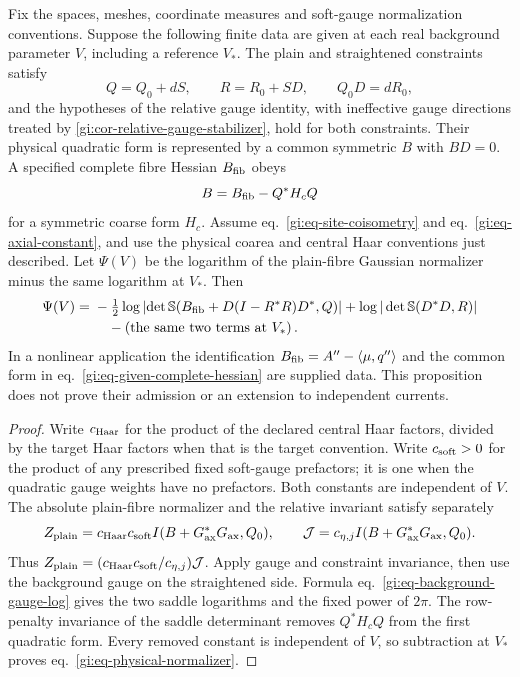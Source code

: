 \documentclass[11pt,letterpaper,reqno]{amsart}
\makeatletter
\numberwithin{equation}{section}
\renewcommand{\eqref}[1]{\textup{eq.~\ref{#1}}}
\theoremstyle{definition}
\newcommand{\ms@minorstart}{%
  \pushQED{\qed}\renewcommand{\qedsymbol}{$\blacksquare$}}
\newenvironment{proposition}[1][]{\ms@minorstart\ms@proposition[#1]}
  {\popQED\endms@proposition}
\theoremstyle{remark}
\makeatother
\begin{document}
\begin{proposition}[Normalized physical Gaussian]
\label{gi:prop-physical-normalizer}
Fix the spaces, meshes, coordinate measures and soft-gauge
normalization conventions. Suppose the following finite data
are given at each real background parameter $V$, including
a reference $V_*$.
The plain and straightened constraints satisfy
\[
 Q=Q_0+dS,\qquad R=R_0+SD,\qquad Q_0D=dR_0,
\]
and the hypotheses of the relative gauge identity,
with ineffective gauge directions treated by \cref{gi:cor-relative-gauge-stabilizer}, hold for both constraints. Their
physical quadratic form is represented by a common
symmetric $B$ with $BD=0$. A specified complete fibre
Hessian $B_{\rm fib}$ obeys
\begin{equation}\label{gi:eq-given-complete-hessian}
                     B=B_{\rm fib}-Q^*H_cQ
\end{equation}
for a symmetric coarse form $H_c$. Assume
\eqref{gi:eq-site-coisometry} and
\eqref{gi:eq-axial-constant}, and use the physical
coarea and central Haar conventions just described.
Let $\Psi(V)$ be the logarithm of the plain-fibre
Gaussian normalizer minus the same logarithm at $V_*$.
Then
\begin{align}
 \Psi(V)={}&
  -\tfrac12\log\left|\det\mathbb S
       (B_{\rm fib}+D(I-R^*R)D^*,Q)\right|
  +\log|\det\mathbb S(D^*D,R)|\nonumber\\
 &\quad-\left(\text{the same two terms at }V_*\right).
 \label{gi:eq-physical-normalizer}
\end{align}
In a nonlinear application the identification
$B_{\rm fib}=A''-\langle\mu,q''\rangle$ and the common
form in \eqref{gi:eq-given-complete-hessian} are supplied
data. This proposition does not prove their admission
or an extension to independent currents.
\end{proposition}

\begin{proof}
Write $c_{\rm Haar}$ for the product of the declared central
Haar factors, divided by the target Haar factors when that
is the target convention. Write $c_{\rm soft}>0$ for the
product of any prescribed fixed soft-gauge prefactors;
it is one when the quadratic gauge weights have no
prefactors. Both constants are independent of $V$.
The absolute plain-fibre normalizer
and the relative invariant satisfy separately
\[
 Z_{\rm plain}=c_{\rm Haar}c_{\rm soft}
                         I(B+G_{\rm ax}^*G_{\rm ax},Q_0),
 \qquad
 \mathcal J=c_{\eta,j}I(B+G_{\rm ax}^*G_{\rm ax},Q_0).
\]
Thus $Z_{\rm plain}=(c_{\rm Haar}c_{\rm soft}/c_{\eta,j})\mathcal J$.
Apply gauge and
constraint invariance, then use the background gauge on
the straightened side. Formula
\eqref{gi:eq-background-gauge-log} gives the two saddle
logarithms and the fixed power of $2\pi$. The row-penalty
invariance of the saddle determinant removes $Q^*H_cQ$
from the first quadratic form. Every removed constant
is independent of $V$, so subtraction at $V_*$ proves
\eqref{gi:eq-physical-normalizer}.
\end{proof}
\end{document}
